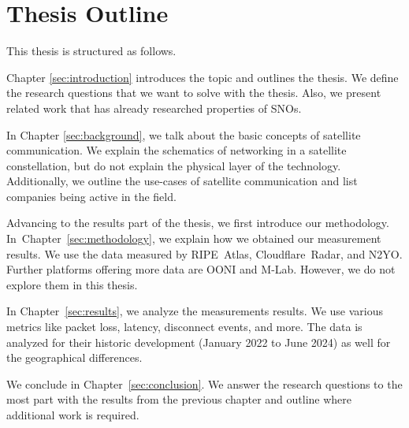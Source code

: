 \section{Thesis Outline}

This thesis is structured as follows.

Chapter \ref{sec:introduction} introduces the topic and outlines the thesis. We
define the research questions that we want to solve with the thesis. Also, we
present related work that has already researched properties of \ac{SNO}s.

In Chapter \ref{sec:background}, we talk about the basic concepts of satellite
communication. We explain the schematics of networking in a satellite
constellation, but do not explain the physical layer of the technology.
Additionally, we outline the use-cases of satellite communication and list
companies being active in the field.

Advancing to the results part of the thesis, we first introduce our
methodology. In~Chapter~\ref{sec:methodology}, we explain how we obtained our
measurement results. We use the data measured by RIPE~Atlas, Cloudflare~Radar,
and N2YO. Further platforms offering more data are OONI and M-Lab. However, we
do not explore them in this thesis.

In Chapter~\ref{sec:results}, we analyze the measurements results. We use
various metrics like packet loss, latency, disconnect events, and more. The
data is analyzed for their historic development (January 2022 to June 2024) as
well for the geographical differences.

We conclude in Chapter~\ref{sec:conclusion}. We answer the research
questions to the most part with the results from the previous chapter and
outline where additional work is required.
